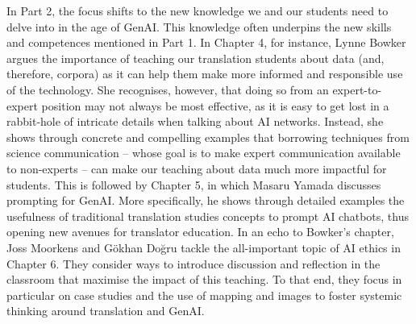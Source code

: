 \documentclass[output=paper]{langscibook}
\begin{document}
In Part 2, the focus shifts to the new knowledge we and our students need to delve into in the age of GenAI. This knowledge often underpins the new skills and competences mentioned in Part 1. In Chapter 4, for instance, Lynne Bowker argues the importance of teaching our translation students about data (and, therefore, corpora) as it can help them make more informed and responsible use of the technology. She recognises, however, that doing so from an expert-to-expert position may not always be most effective, as it is easy to get lost in a rabbit-hole of intricate details when talking about AI networks. Instead, she shows through concrete and compelling examples that borrowing techniques from science communication – whose goal is to make expert communication available to non-experts – can make our teaching about data much more impactful for students. This is followed by Chapter 5, in which Masaru Yamada discusses prompting for GenAI. More specifically, he shows through detailed examples the usefulness of traditional translation studies concepts to prompt AI chatbots, thus opening new avenues for translator education. In an echo to Bowker’s chapter, Joss Moorkens and Gökhan Doğru tackle the all-important topic of AI ethics in Chapter 6. They consider ways to introduce discussion and reflection in the classroom that maximise the impact of this teaching. To that end, they focus in particular on case studies and the use of mapping and images to foster systemic thinking around translation and GenAI.
\end{document}
